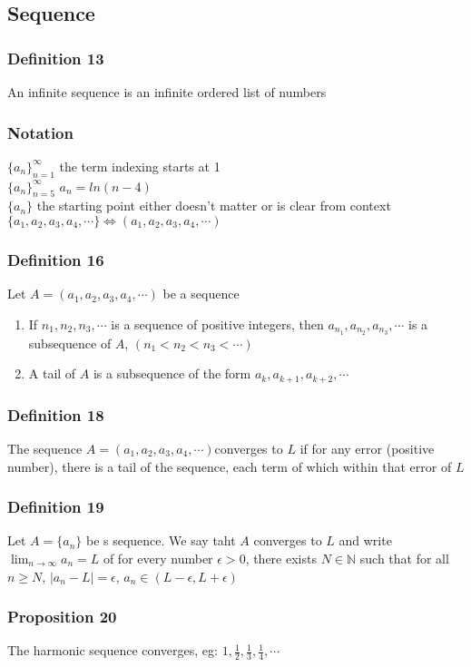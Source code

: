 \documentclass[12pt, letterpaper]{article}
\begin{document}
\subsection{Sequence}
\subsubsection*{Definition 13}
An infinite sequence is an infinite ordered list of numbers 
\subsubsection*{Notation}
$\{a_n\}^\infty _{n = 1}$ the term indexing starts at 1 \\
$\{a_n\}^\infty _{n = 5}$ $a_n = ln(n-4)$ \\
$\{a_n\}$ the starting point either doesn't matter or is clear from context \\
$\{a_1, a_2, a_3, a_4, \cdots\} \iff (a_1, a_2, a_3, a_4, \cdots)$
\subsubsection*{Definition 16}
Let $A = (a_1, a_2, a_3, a_4, \cdots)$ be a sequence
\begin{enumerate}
    \item If $n_1, n_2, n_3, \cdots$ is a sequence of positive integers, then $a_{n_1}, a_{n_2}, a_{n_3}, \cdots$ is a subsequence of $A$, $(n_1 < n_2 < n_3 < \cdots)$
    \item A tail of $A$ is a subsequence of the form $a_k, a_{k+1}, a_{k+2}, \cdots$
\end{enumerate}
\subsubsection*{Definition 18}
The sequence $A = (a_1, a_2, a_3, a_4, \cdots)$converges to $L$ if for any error (positive number),
there is a tail of the sequence, each term of which within that error of $L$
\subsubsection*{Definition 19}
Let $A = \{a_n\}$ be s sequence. We say taht $A$ converges to $L$ and write $\displaystyle\lim_{n\to\infty} {a_n} = L$
of for every number $\epsilon > 0$, there exists $N \in \mathbb{N}$ such that for all $n \geq N$, 
$|a_n - L| = \epsilon$, $a_n \in (L-\epsilon, L+\epsilon)$
\subsubsection*{Proposition 20}
The harmonic sequence converges, eg: $1, \frac{1}{2}, \frac{1}{3}, \frac{1}{4}, \cdots$
\end{document}
